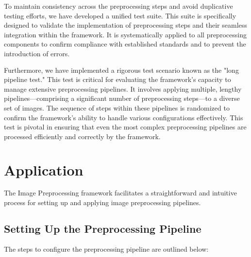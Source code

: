 \documentclass[journal ]{new-aiaa}
\begin{document}
To maintain consistency across the preprocessing steps and avoid duplicative testing efforts, we have developed a unified test suite. This suite is specifically designed to validate the implementation of preprocessing steps and their seamless integration within the framework. It is systematically applied to all preprocessing components to confirm compliance with established standards and to prevent the introduction of errors.

Furthermore, we have implemented a rigorous test scenario known as the "long pipeline test." This test is critical for evaluating the framework's capacity to manage extensive preprocessing pipelines. It involves applying multiple, lengthy pipelines—comprising a significant number of preprocessing steps—to a diverse set of images. The sequence of steps within these pipelines is randomized to confirm the framework's ability to handle various configurations effectively. This test is pivotal in ensuring that even the most complex preprocessing pipelines are processed efficiently and correctly by the framework.


\section{Application}
The Image Preprocessing framework facilitates a straightforward and intuitive process for setting up and applying image preprocessing pipelines.

\subsection{Setting Up the Preprocessing Pipeline}
The steps to configure the preprocessing pipeline are outlined below:
\end{document}
